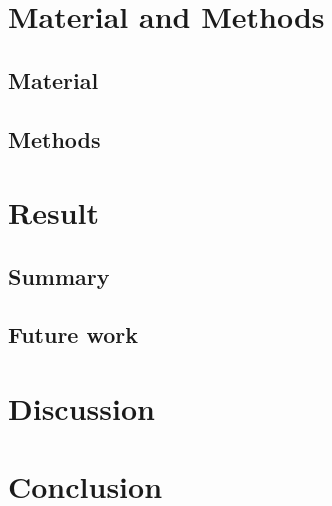 \documentclass[12pt]{report}
\begin{document}
\chapter{Material and Methods}
\section{Material}
\section{Methods}


\chapter{Result}
\section{Summary}
\section{Future work}


\chapter{Discussion}



\chapter{Conclusion}

\newpage


\printbibliography[title=References]
\end{document}
